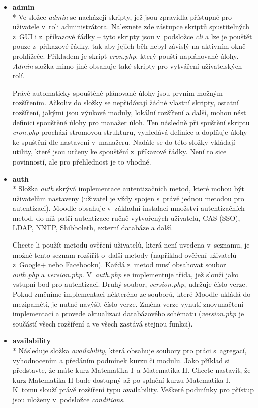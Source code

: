 \documentclass[
print,
  11pt,
  table,   
  nolof,    
  nolot,
  oneside,
  draft
]{fithesis3}
\begin{document}
\begin{itemize}
\item \textbf{admin} \\*
Ve složce \emph{admin} se nacházejí skripty, jež jsou zpravidla přístupné pro uživatele v~roli administrátora. Naleznete zde zástupce skriptů spustitelných z~GUI i z~příkazové řádky – tyto skripty jsou v~podsložce \emph{cli} a lze je pouštět pouze z~příkazové řádky, tak aby jejich běh nebyl závislý na aktivním okně prohlížeče. Příkladem je skript \emph{cron.php}, který pouští naplánované úlohy. \emph{Admin} složka mimo jiné obsahuje také skripty pro vytváření uživatelských rolí. 

Právě automaticky spouštěné plánované úlohy jsou prvním možným rozšířením. Ačkoliv do složky se nepřidávají žádné vlastní skripty, ostatní rozšíření, jakými jsou výukové moduly, lokální rozšíření a další, mohou nést definici spouštěné úlohy pro manažer úloh. Ten následně při spuštění skriptu \emph{cron.php} prochází stromovou strukturu, vyhledává definice a doplňuje úlohy ke spuštění dle nastavení v~manažeru. Nadále se do této složky vkládají utility, které jsou určeny ke spouštění z~příkazové řádky. Není to sice povinností, ale pro přehlednost je to vhodné.

\item \textbf{auth} \\*
Složka \emph{auth} skrývá implementace autentizačních metod, které mohou být uživatelům nastaveny (uživatel je vždy spojen s~právě jednou metodou pro autentizaci). Moodle obsahuje v~základní instalaci množství autentizačních metod, do níž patří autentizace ručně vytvořených uživatelů, CAS (SSO), LDAP, NNTP, Shibboleth, externí databáze a další. 

Chcete-li použít metodu ověření uživatelů, která není uvedena v~seznamu, je možné tento seznam rozšířit o~další metody (například ověření uživatelů z~Google+ nebo Facebooku). Každá z~metod musí obsahovat soubor \emph{auth.php} a \emph{version.php}. V~\emph{auth.php} se implementuje třída, jež slouží jako vstupní bod pro autentizaci. Druhý soubor, \emph{version.php}, udržuje číslo verze. Pokud změníme implementaci některého ze souborů, které Moodle ukládá do mezipaměti, je nutné navýšit číslo verze. Změna verze vynutí znovunačtení implementací a provede aktualizaci databázového schématu (\emph{version.php} je součástí všech rozšíření a ve všech zastává stejnou funkci). 


\item \textbf{availability} \\*
Následuje složka \emph{availability}, která obsahuje soubory pro práci s~agregací, vyhodnocením a předáním podmínek kurzu či modulu. Jako příklad si představte, že máte kurz Matematika I~a Matematika II. Chcete nastavit, že kurz Matematika II bude dostupný až po splnění kurzu Matematika I. K~tomu slouží právě rozšíření typu availability. Veškeré podmínky pro přístup jsou uloženy v~podsložce \emph{conditions}.


\end{itemize}
\end{document}
